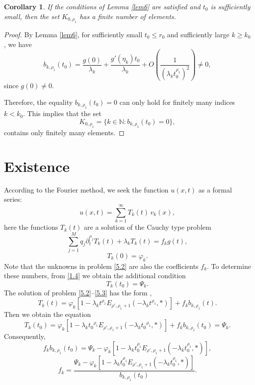 \documentclass[12pt, reqno]{amsart}
\newtheorem{corollary}[theorem]{Corollary}
\theoremstyle{definition}
\theoremstyle{remark}
\numberwithin{equation}{section}
\begin{document}
\begin{corollary}\label{cor2}
If the conditions of Lemma \ref{lem6} are satisfied and $t_0$ is sufficiently small, then the set $K_{0,\rho_1}$ has a finite number of elements.
\end{corollary}

\begin{proof}
By Lemma \ref{lem6}, for sufficiently small $t_0 \le r_0$ and sufficiently large $k \ge k_0$, we have
\[
b_{k,\rho_1}(t_0) = \frac{g(0)}{\lambda_k} + \frac{g'(\eta_k) t_0}{\lambda_k } +  O\left(\frac{1}{(\lambda_k t^{\rho_1}_0)^{2}}\right) \neq 0,
\]
since $g(0) \neq 0$. 

Therefore, the equality $b_{k,\rho_1}(t_0) = 0$ can only hold for finitely many indices $k < k_0$. 
This implies that the set
\[
K_{0,\rho_1} = \{ k \in \mathbb{N} : b_{k,\rho_1}(t_0) = 0 \},
\]
contains only finitely many elements. 
\end{proof}


\section{Existence}
\label{sec:5}
According to the Fourier method, we seek the function $u(x, t)$ as a formal series:
\begin{equation}\label{5.1}
u(x, t) = \sum_{k=1}^{\infty} T_k(t) \, v_k(x),
\end{equation}
here the functions $T_k(t)$ are a solution of the Cauchy type problem
\begin{equation}\label{5.2}
\sum_{j=1}^M q_j\partial_t^{\rho_{j}} T_k(t) + \lambda_k T_k(t) = f_kg(t),  \end{equation}
\begin{equation}\label{5.3}
T_k(0) = \varphi_k. 
\end{equation}
Note that the unknowns in problem \eqref{5.2} are also the coefficients $f_k$. To determine these numbers, from \eqref{1.4} we obtain the additional condition
\begin{equation}\label{5.4}
    T_k(t_0)=\Psi_k.
\end{equation}
The solution of problem \eqref{5.2}--\eqref{5.3} has the form \cite{11},
\begin{equation}\label{5.5}
T_k(t) = \varphi_k \left[ 1 - \lambda_k t^{\rho_1} E_{ \rho', \rho_1 + 1} \left( -\lambda_k t^{\rho_1}, * \right) \right]
+ f_kb_{k,\rho_1}(t).
\end{equation}
Then we obtain the equation
$$T_k(t_0) = \varphi_k \left[ 1 - \lambda_k {t_0}^{\rho_1} E_{ \rho', \rho_1 + 1} \left( -\lambda_k {t_0}^{\rho_1}, * \right) \right]+ f_kb_{k,\rho_1}(t_0)=\Psi_k.$$ 
Consequently,
\begin{equation}\label{5.6}
f_kb_{k,\rho_1}(t_0)=\Psi_k-\varphi_k \left[ 1 - \lambda_k t_0^{\rho_1} E_{ \rho', \rho_1 + 1} \left( -\lambda_k t_0^{\rho_1}, * \right) \right],
\end{equation}
\begin{equation}\label{5.7}
f_k=\frac{\Psi_k-\varphi_k \left[ 1 - \lambda_k t_0^{\rho_1} E_{ \rho', \rho_1 + 1} \left( -\lambda_k t_0^{\rho_1}, * \right) \right]}{b_{k,\rho_1}(t_0)}.
\end{equation}
\end{document}
